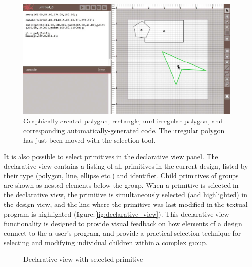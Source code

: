 \documentclass{sigchi}
\begin{document}
\begin{center}
\begin{figure}[h!]
\includegraphics[width=\columnwidth]{images/auto_generated_code.jpg}
\caption{Graphically created polygon, rectangle, and irregular polygon, and corresponding automatically-generated code. The irregular polygon has just been moved with the selection tool.}
\label{fig:auto_generated_code}
\end{figure}
\end{center}

It is also possible to select primitives in the declarative view panel. The declarative view contains a listing of all primitives in the current design, listed by their type (polygon, line, ellipse etc.) and identifier. Child primitives of groups are shown as nested elements below the group. When a primitive is selected in the declarative view, the primitive is simultaneously selected (and highlighted) in the design view, and the line where the primitive was last modified in the textual program is highlighted (figure:\ref{fig:declarative_view}). This declarative view functionality is designed to provide visual feedback on how elements of a design connect to the a user's program, and provide a practical selection technique for selecting and modifying individual children within a complex group.


\begin{center}
\begin{figure}[h!]
\caption{Declarative view with selected primitive}
\label{fig:declarative view}
\end{figure}
\end{center}
\end{document}
